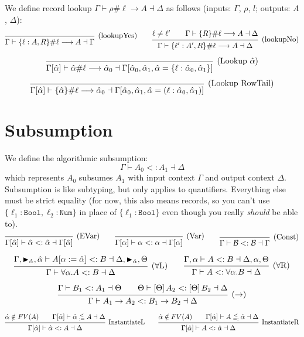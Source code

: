 \documentclass{article}
\newcommand{\B}{\mathcal{B}}
\newcommand{\marker}[1]{\RHD_{#1}}
\newcommand{\subtype}{<:}
\newcommand{\instLSymbol}{\;\substack{<\\:=}\;}
\newcommand{\instRSymbol}{\;\substack{<\\=:}\;}
\newcommand{\ev}{\hat}
\newcommand{\spc}{\qquad}
\newcommand{\apply}[1]{\left[#1\right]}
\newcommand{\subtypes}[4]{#1 \vdash #2 \subtype #3 \dashv #4}
\newcommand{\instL}[4]{#1 \vdash #2 \instLSymbol #3 \dashv #4}
\newcommand{\instR}[4]{#1 \vdash #2 \instRSymbol #3 \dashv #4}
\newcommand{\lookup}[5]{#1 \vdash #2 \# #3 \longrightarrow #4 \dashv #5}
\newcommand{\deduct}[3][]
{
  \begin{prooftree}
    \hypo{#2}
    \infer1[\text{#1}]{#3}
  \end{prooftree}
}
\begin{document}
\noindent
We define record lookup $\lookup{\Gamma}{\rho}{\ell}{A}{\Delta}$ as follows (inputs: $\Gamma$, $\rho$, $l$; outputs: $A$, $\Delta$):
\[
\deduct[(lookupYes)]{}{\lookup{\Gamma}{\{\ell : A, R\}}{\ell}{A}{\Gamma}}
\spc
\deduct[(lookupNo)]
  {\ell \neq \ell' \spc \lookup{\Gamma}{\{R\}}{\ell}{A}{\Delta}}
  {\lookup{\Gamma}{\{\ell' : A', R\}}{\ell}{A}{\Delta}}
\]

\[
\deduct[(Lookup \(\ev\alpha\))]
  { }
  { \lookup
      {\Gamma[\ev\alpha]}
      {\ev\alpha}
      {\ell}
      {\ev\alpha_0}
      {\Gamma[\ev\alpha_0, \ev\alpha_1, \ev\alpha = \{\ell : \ev\alpha_0, \ev\alpha_1\}] }
  }
\]

\[
\deduct[(Lookup RowTail)]
  { }
  { \lookup
      {\Gamma[\ev\alpha]}
      {\{\ev\alpha\}}
      {\ell}
      {\ev\alpha_0}
      {\Gamma[\ev\alpha_0, \ev\alpha_1, \ev\alpha = (\ell : \ev\alpha_0, \ev\alpha_1)] }
  }
\]

\section{Subsumption}
We define the algorithmic subsumption:
\[
\subtypes{\Gamma}{A_0}{A_1}{\Delta}
\]
which represents $A_0$ subsumes $A_1$ with input context $\Gamma$ and output
context $\Delta$. Subsumption is like subtyping, but only applies to
quantifiers. Everything else must be strict equality (for now, this also means
records, so you can't use \(\{\ell_1: \texttt{Bool}, \ell_2: \texttt{Num}\}\) in
place of \(\{\ell_1 : \texttt{Bool}\}\) even though you really \emph{should} be
able to).
\[
  \deduct[(EVar)]{}{\subtypes{\Gamma[\ev\alpha]}{\ev\alpha}{\ev\alpha}{\Gamma[\ev\alpha]}}
  \spc
  \deduct[(Var)]{}{\subtypes{\Gamma[\alpha]}{\alpha}{\alpha}{\Gamma[\alpha]}}
  \spc
  \deduct[(Const)]{}{\subtypes{\Gamma}{\B}{\B}{\Gamma}}
\]

\[
  \deduct[(\(\forall\)L)]
  { \subtypes{\Gamma, \marker{\ev\alpha}, \ev\alpha}{A[\alpha := \ev\alpha]}{B}{\Delta, \marker{\ev\alpha}, \Theta} }
  { \subtypes{\Gamma}{\forall \alpha. A}{B}{\Delta} }
  \spc
  \deduct[(\(\forall\)R)]
  { \subtypes{\Gamma, \alpha}{A}{B}{\Delta, \alpha, \Theta} }
  { \subtypes{\Gamma}{A}{\forall \alpha. B}{\Delta} }
\]

\[
  \deduct[(\(\to\))]
  { \subtypes{\Gamma}{B_1}{A_1}{\Theta} \spc \subtypes{\Theta}{\apply\Theta A_2}{\apply\Theta B_2}{\Delta} }
  { \subtypes{\Gamma}{A_1 \to A_2}{B_1 \to B_2}{\Delta} }
\]

\[
  \deduct[InstantiateL]
  {\ev \alpha \notin FV(A) \spc \instL{\Gamma[\ev \alpha]}{\ev
      \alpha}{A}{\Delta}}
  {\subtypes{\Gamma[\ev \alpha]}{\ev \alpha}{A}{\Delta}}
  \spc
  \deduct[InstantiateR]
  {\ev \alpha \notin FV(A) \spc \instR{\Gamma[\ev \alpha]}{A}{\ev
      \alpha}{\Delta}}
  {\subtypes{\Gamma[\ev \alpha]}{A}{\ev \alpha}{\Delta}}
\]
\end{document}

